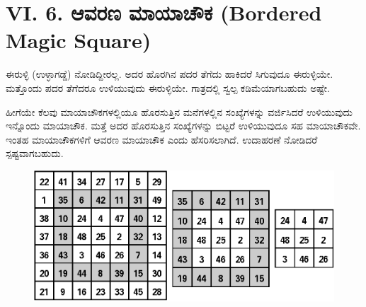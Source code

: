 \section*{VI. 6. ಆವರಣ ಮಾಯಾಚೌಕ (Bordered Magic Square)}

ಈರುಳ್ಳಿ (ಉಳ್ಳಾಗಡ್ಡೆ) ನೋಡಿದ್ದೀರಲ್ಲ. ಅದರ ಹೊರಗಿನ ಪದರ ತೆಗೆದು ಹಾಕಿದರೆ ಸಿಗುವುದೂ ಈರುಳ್ಳಿಯೇ. ಮತ್ತೊಂದು ಪದರ ತೆಗೆದರೂ ಉಳಿಯುವುದು ಈರುಳ್ಳಿಯೇ. ಗಾತ್ರದಲ್ಲಿ ಸ್ವಲ್ಪ ಕಡಿಮೆಯಾಗಬಹುದು ಅಷ್ಟೇ.

ಹೀಗೆಯೇ ಕೆಲವು ಮಾಯಾಚೌಕಗಳಲ್ಲಿಯೂ ಹೊರಸುತ್ತಿನ ಮನೆಗಳಲ್ಲಿನ ಸಂಖ್ಯೆಗಳನ್ನು ವರ್ಜಿಸಿದರೆ ಉಳಿಯುವುದು ಇನ್ನೊಂದು ಮಾಯಾಚೌಕ. ಮತ್ತೆ ಅದರ ಹೊರಸುತ್ತಿನ ಸಂಖ್ಯೆ\-ಗಳನ್ನು ಬಿಟ್ಟರೆ ಉಳಿಯುವುದೂ ಸಹ ಮಾಯಾಚೌಕವೇ. ಇಂತಹ ಮಾಯಾಚೌಕಗಳಿಗೆ \hbox{ಆವರಣ} ಮಾಯಾಚೌಕ ಎಂದು ಹೆಸರಿಸಲಾಗಿದೆ. ಉದಾಹರಣೆ ನೋಡಿದರೆ ಸ್ಪಷ್ಟವಾಗ\-ಬಹುದು.
\begin{figure}[H]
\includegraphics[scale=.85]{src/figures/chap5/fig5-8.eps}
\end{figure}

